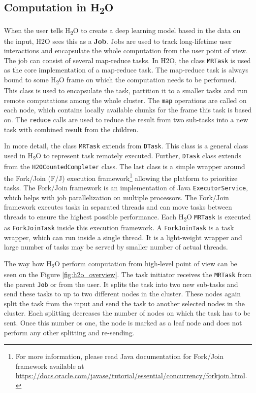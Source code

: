 \subsection{Computation in H\textsubscript{2}O}
When the user tells H\textsubscript{2}O to create a deep learning model based in the data on the input, H2O sees this as a \textbf{Job}. Jobs are used to track long-lifetime user interactions and encapsulate the whole computation from the user point of view. The job can consist of several map-reduce tasks. In H2O, the class \texttt{MRTask} is used as the core implementation of a map-reduce task. The map-reduce task is always bound to some H\textsubscript{2}O frame on which the computation needs to be performed. This class is used to encapsulate the task, partition it to a smaller tasks and run remote computations among the whole cluster. The \texttt{map} operations are called on each node, which contains locally available chunks for the frame this task is based on. The \texttt{reduce} calls are used to reduce the result from two sub-tasks into a new task with combined result from the children.

In more detail, the class \texttt{MRTask} extends from \texttt{DTask}. This class is a general class used in H\textsubscript{2}O to represent task remotely executed. Further, \texttt{DTask} class extends from the \texttt{H2OCountedCompleter} class. The last class is a simple wrapper around the Fork/Join (F/J) execution framework\footnote{For more information, please read Java documentation for Fork/Join framework available at \url{https://docs.oracle.com/javase/tutorial/essential/concurrency/forkjoin.html}.} allowing the platform to prioritize tasks. The Fork/Join framework is an implementation of Java \texttt{ExecutorService}, which helps with job parallelization on multiple processors. The Fork/Join framework executes tasks in separated threads and can move tasks between threads to ensure the highest possible performance. Each H\textsubscript{2}O \texttt{MRTask} is executed as \texttt{ForkJoinTask} inside this execution framework. A \texttt{ForkJoinTask} is a task wrapper, which can run inside a single thread. It is a light-weight wrapper and large number of tasks may be served by smaller number of actual threads.

The way how H\textsubscript{2}O perform computation from high-level point of view can be seen on the Figure \ref{fig:h2o_overview}. The task initiator receives the \texttt{MRTask} from the parent \texttt{Job} or from the user. It splits the task into two new sub-tasks and send these tasks to up to two different nodes in the cluster. These nodes again split the task from the input and send the task to another selected nodes in the cluster. Each splitting decreases the number of nodes on which the task has to be sent. Once this number os one, the node is marked as a leaf node and does not perform any other splitting and re-sending.

